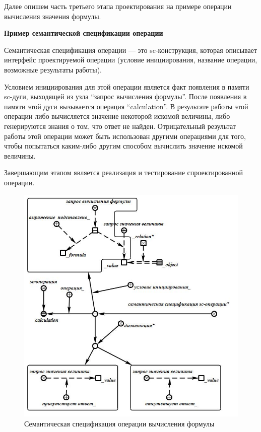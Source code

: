 Далее опишем часть третьего этапа проектирования на примере операции вычисления значения формулы.

\textbf{Пример семантической спецификации операции}

Семантическая спецификация операции --- это sc-конструкция, которая описывает интерфейс проектируемой операции (условие инициирования, название операции, возможные результаты работы).

Условием инициирования для этой операции является факт появле­ния в памяти sc-дуги, выходящей из узла ``запрос вычисления формулы''. После появления в памяти этой дуги вызывается операция ``calculation''. В результате работы этой операции либо вычисляется значение некоторой искомой величины, либо генерируются знания о том, что ответ не найден. Отрицательный результат работы этой операции может быть использован другими операциями для того, чтобы попытаться каким-либо другим способом вычислить значение искомой величины.

Завершающим этапом является реализация и тестирование спроектированной операции.

\begin{figure}[H]
	\includegraphics[scale=0.5]{images/part7/chapter_learning_systems/step1.jpg}
	\caption{Семантическая спецификация операции вычисления формулы}
	\label{fig:step1}
\end{figure}

